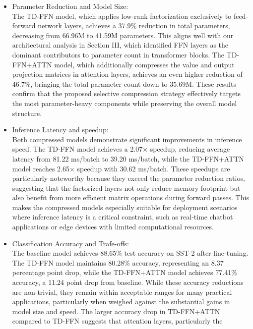 \documentclass[conference]{IEEEtran}
\begin{document}
\begin{itemize}
    \item Parameter Reduction and Model Size: \\
            The TD-FFN model, which applies low-rank factorization exclusively to feed-forward network layers, achieves a 37.9\%
            reduction in total parameters, decreasing from 66.96M to 41.59M parameters. This aligns well with our architectural
            analysis in Section III, which identified FFN layers as the dominant contributors to parameter count in transformer
            blocks. The TD-FFN+ATTN model, which additionally compresses the value and output projection matrices in attention
            layers, achieves an even higher reduction of 46.7\%, bringing the total parameter count down to 35.69M.
            These results confirm that the proposed selective compression strategy effectively targets the most parameter-heavy
            components while preserving the overall model structure.
    \item Inference Latency and speedup:\\
            Both compressed models demonstrate significant improvements in inference speed. The TD-FFN model achieves a 2.07×
            speedup, reducing average latency from 81.22 ms/batch to 39.20 ms/batch, while the TD-FFN+ATTN model reaches 2.65×
            speedup with 30.62 ms/batch. These speedups are particularly noteworthy because they exceed the parameter reduction
            ratios, suggesting that the factorized layers not only reduce memory footprint but also benefit from more efficient
            matrix operations during forward passes. This makes the compressed models especially suitable for deployment
            scenarios where inference latency is a critical constraint, such as real-time chatbot applications or edge devices
            with limited computational resources.
    \item Classification Accuracy and Trafe-offs:\\
            The baseline model achieves 88.65\% test accuracy on SST-2 after fine-tuning. The TD-FFN model maintains 80.28\%
            accuracy, representing an 8.37 percentage point drop, while the TD-FFN+ATTN model achieves 77.41\% accuracy,
            a 11.24 point drop from baseline. While these accuracy reductions are non-trivial, they remain within acceptable
            ranges for many practical applications, particularly when weighed against the substantial gains in model size and
            speed. The larger accuracy drop in TD-FFN+ATTN compared to TD-FFN suggests that attention layers, particularly the

\end{itemize}
\end{document}
